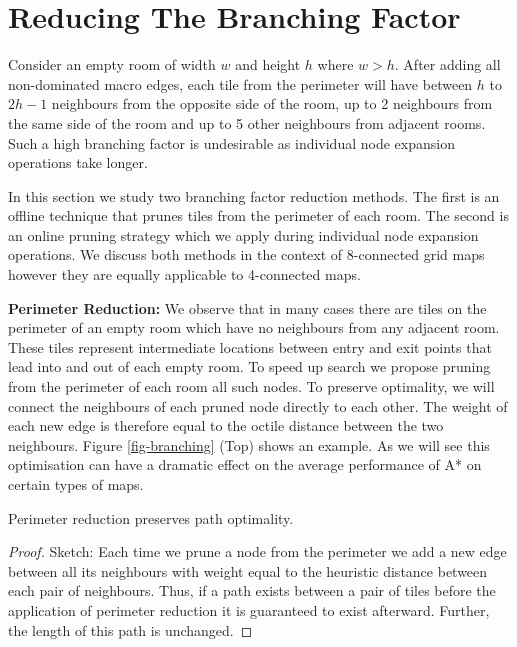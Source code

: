 \section{Reducing The Branching Factor}
Consider an empty room of width $w$ and height $h$ where $w > h$.  After adding
all non-dominated macro edges, each tile from the perimeter will have between $h$ to $2h-1$
neighbours from the opposite side of the room, up to 2 neighbours from the same
side of the room and up to 5 other neighbours from adjacent rooms.  Such a high
branching factor is undesirable as individual node expansion operations take
longer.

In this section we
study two branching factor reduction methods.  The first is an offline technique
that prunes tiles from the perimeter of each room.  The second is an online
pruning strategy which we apply during individual node expansion operations.  We
discuss both methods in the context of 8-connected grid maps however they are
equally applicable to 4-connected maps.

\noindent
\textbf{Perimeter Reduction:}
We observe that in many cases there are tiles on the perimeter of an empty room which have no neighbours from any 
adjacent room. 
These tiles represent intermediate locations between entry and exit points that lead into and out of each empty room.
To speed up search we propose pruning from the perimeter of each room all such nodes.
To preserve optimality, we will connect the neighbours of each pruned node directly to each other.
The weight of each new edge is therefore equal to the octile distance between the two neighbours.
Figure \ref{fig-branching} (Top) shows an example.
As we will see this optimisation can have a dramatic effect on the average performance of
A* on certain types of maps.

\begin{lemma}
Perimeter reduction preserves path optimality.
\end{lemma}
\begin{proof}
Sketch:
Each time we prune a node from the perimeter we add a new edge between all its
neighbours with weight equal to the heuristic distance between each pair of 
neighbours.
Thus, if a path exists between a pair of tiles before the application of
perimeter reduction it is guaranteed to exist afterward.
Further, the length of this path is unchanged.
\end{proof}

